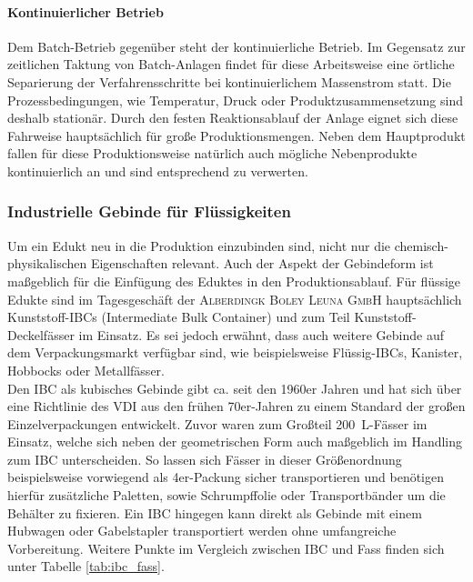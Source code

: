 \paragraph{Kontinuierlicher Betrieb} Dem Batch-Betrieb gegenüber steht der kontinuierliche Betrieb. Im Gegensatz zur zeitlichen Taktung von Batch-Anlagen findet für diese Arbeitsweise eine örtliche Separierung der Verfahrensschritte bei kontinuierlichem Massenstrom statt. Die Prozessbedingungen, wie Temperatur, Druck oder Produktzusammensetzung sind deshalb stationär. Durch den festen Reaktionsablauf der Anlage eignet sich diese Fahrweise hauptsächlich für große Produktionsmengen. Neben dem Hauptprodukt fallen für diese Produktionsweise natürlich auch mögliche Nebenprodukte kontinuierlich an und sind entsprechend zu verwerten. \cite{Ignatowitz.2015}


\subsubsection{Industrielle Gebinde für Flüssigkeiten}
Um ein Edukt neu in die Produktion einzubinden sind, nicht nur die chemisch-physikalischen Eigenschaften relevant. Auch der Aspekt der Gebindeform ist maßgeblich für die Einfügung des Eduktes in den Produktionsablauf. Für flüssige Edukte sind im Tagesgeschäft der \textsc{Alberdingk Boley Leuna GmbH} hauptsächlich Kunststoff-IBCs (Intermediate Bulk Container) und zum Teil Kunststoff-Deckelfässer im Einsatz. Es sei jedoch erwähnt, dass auch weitere Gebinde auf dem Verpackungsmarkt verfügbar sind, wie beispielsweise Flüssig-IBCs, Kanister, Hobbocks oder Metallfässer.\\
Den IBC als kubisches Gebinde gibt ca. seit den 1960er Jahren  und hat sich über eine Richtlinie des VDI aus den frühen 70er-Jahren zu einem Standard der großen Einzelverpackungen entwickelt. Zuvor waren zum Großteil \SI{200}{\liter}-Fässer im Einsatz, welche sich neben der geometrischen Form auch maßgeblich im Handling zum IBC unterscheiden. \cite{neueverpackung.01.02.2022}
So lassen sich Fässer in dieser Größenordnung beispielsweise vorwiegend als 4er-Packung sicher transportieren und benötigen hierfür zusätzliche Paletten, sowie Schrumpffolie oder Transportbänder um die Behälter zu fixieren. Ein IBC hingegen kann direkt als Gebinde mit einem Hubwagen oder Gabelstapler transportiert werden ohne umfangreiche Vorbereitung. Weitere Punkte im Vergleich zwischen IBC und Fass finden sich unter Tabelle \ref{tab:ibc_fass}.

